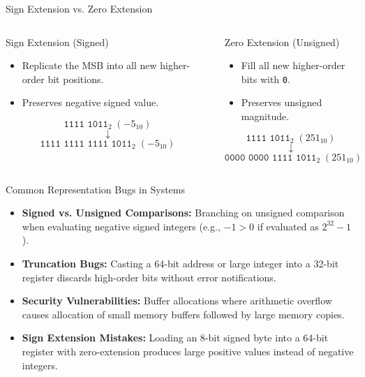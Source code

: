 \documentclass[aspectratio=169,11pt]{beamer}
\newcommand{\key}[1]{\textbf{#1}}
\newcommand{\bits}[1]{\texttt{#1}}
\begin{document}
\begin{frame}{Sign Extension vs. Zero Extension}

\begin{columns}[T,onlytextwidth]

\begin{block}{Sign Extension (Signed)}
\begin{itemize}
  \item Replicate the MSB into all new higher-order bit positions.
  \item Preserves negative signed value.
\end{itemize}
$$\bits{1111 1011}_2 \; (-5_{10})$$
$$\downarrow$$
$$\bits{1111 1111 1111 1011}_2 \; (-5_{10})$$
\end{block}

\begin{block}{Zero Extension (Unsigned)}
\begin{itemize}
  \item Fill all new higher-order bits with \bits{0}.
  \item Preserves unsigned magnitude.
\end{itemize}
$$\bits{1111 1011}_2 \; (251_{10})$$
$$\downarrow$$
$$\bits{0000 0000 1111 1011}_2 \; (251_{10})$$
\end{block}

\end{columns}

\end{frame}


\begin{frame}{Common Representation Bugs in Systems}

\begin{itemize}
  \item \key{Signed vs. Unsigned Comparisons:} Branching on unsigned comparison when evaluating negative signed integers (e.g., $-1 > 0$ if evaluated as $2^{32}-1$).
  \item \key{Truncation Bugs:} Casting a 64-bit address or large integer into a 32-bit register discards high-order bits without error notifications.
  \item \key{Security Vulnerabilities:} Buffer allocations where arithmetic overflow causes allocation of small memory buffers followed by large memory copies.
  \item \key{Sign Extension Mistakes:} Loading an 8-bit signed byte into a 64-bit register with zero-extension produces large positive values instead of negative integers.
\end{itemize}

\end{frame}
\end{document}
